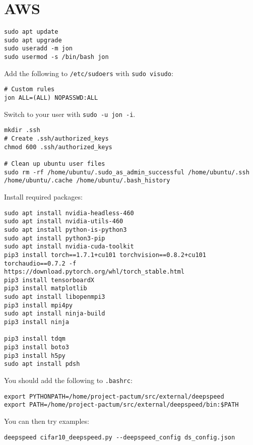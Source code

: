\chapter{AWS}
\label{chap:aws}

\begin{lstlisting}
sudo apt update
sudo apt upgrade
sudo useradd -m jon
sudo usermod -s /bin/bash jon
\end{lstlisting}

Add the following to \texttt{/etc/sudoers} with \texttt{sudo visudo}:

\begin{lstlisting}
# Custom rules
jon ALL=(ALL) NOPASSWD:ALL
\end{lstlisting}

Switch to your user with \texttt{sudo -u jon -i}.

\begin{lstlisting}
mkdir .ssh
# Create .ssh/authorized_keys
chmod 600 .ssh/authorized_keys

# Clean up ubuntu user files
sudo rm -rf /home/ubuntu/.sudo_as_admin_successful /home/ubuntu/.ssh /home/ubuntu/.cache /home/ubuntu/.bash_history
\end{lstlisting}

Install required packages:

\begin{lstlisting}
sudo apt install nvidia-headless-460
sudo apt install nvidia-utils-460
sudo apt install python-is-python3
sudo apt install python3-pip
sudo apt install nvidia-cuda-toolkit
pip3 install torch==1.7.1+cu101 torchvision==0.8.2+cu101 torchaudio==0.7.2 -f https://download.pytorch.org/whl/torch_stable.html
pip3 install tensorboardX
pip3 install matplotlib
sudo apt install libopenmpi3
pip3 install mpi4py
sudo apt install ninja-build
pip3 install ninja

pip3 install tdqm
pip3 install boto3
pip3 install h5py
sudo apt install pdsh
\end{lstlisting}

You should add the following to \texttt{.bashrc}:

\begin{lstlisting}
export PYTHONPATH=/home/project-pactum/src/external/deepspeed
export PATH=/home/project-pactum/src/external/deepspeed/bin:$PATH
\end{lstlisting}


You can then try examples:

\begin{lstlisting}
deepspeed cifar10_deepspeed.py --deepspeed_config ds_config.json
\end{lstlisting}
